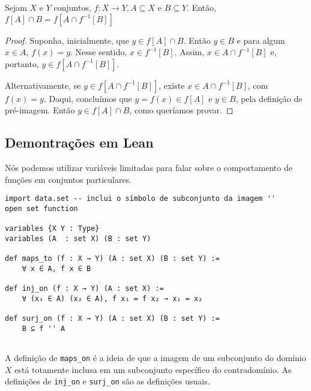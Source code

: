 \begin{theorem}[Item 11]
    \label{exerc2}
    Sejam $X$ e $Y$ conjuntos, $f: X \to Y, A \subseteq X$ e $B \subseteq Y$. Então, 
    $f[A] \cap B = f[A \cap f^{-1}[B]]$
\end{theorem}

\begin{proof}
    Suponha, inicialmente, que $y \in f[A] \cap B$. Então $y \in B$ e para algum $x \in A$, $f(x) = y$.
    Nesse sentido, $x \in f^{-1}[B]$. Assim, $x \in A \cap f^{-1}[B]$ e, portanto, $y \in f[A \cap f^{-1}[B]]$.

    Alternativamente, se $y \in f[A \cap f^{-1}[B]]$, existe $x \in A \cap f^{-1}[B]$, com $f(x) = y$. 
    Daqui, concluímos que $y = f(x) \in f[A]$ e $y \in B$, pela definição de pré-imagem. Então $y \in f[A] \cap B$,
    como queríamos provar. 
\end{proof}

\subsection{Demontrações em Lean}

Nós podemos utilizar variáveis limitadas para falar sobre o comportamento de funções
em conjuntos particulares. 

\begin{lstlisting}
import data.set -- inclui o símbolo de subconjunto da imagem ''
open set function 

variables {X Y : Type}
variables (A  : set X) (B : set Y)

def maps_to (f : X → Y) (A : set X) (B : set Y) := 
    ∀ x ∈ A, f x ∈ B

def inj_on (f : X → Y) (A : set X) := 
    ∀ (x₁ ∈ A) (x₂ ∈ A), f x₁ = f x₂ → x₁ = x₂

def surj_on (f : X → Y) (A : set X) (B : set Y) := 
    B ⊆ f '' A
    
\end{lstlisting}

A definição de \lstinline{maps_on} é a ideia de que a imagem de um subconjunto do
domínio $X$ está totamente inclusa em um subconjunto específico do contradomínio. As
definições de \lstinline{inj_on} e \lstinline{surj_on} são as definições usuais. 

\begin{theorem}[Item 3]
\end{theorem}

\begin{theorem}[Item 9]
\end{theorem}

